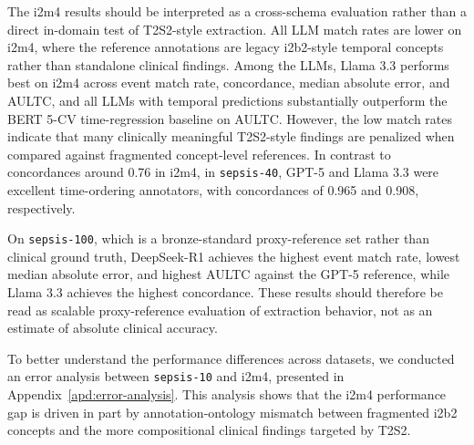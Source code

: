 \documentclass[pmlr,twocolumn,10pt]{jmlr} %
\begin{document}
The i2m4 results should be interpreted as a cross-schema evaluation rather than a direct in-domain test of T2S2-style extraction.
All LLM match rates are lower on i2m4, where the reference annotations are legacy i2b2-style temporal concepts rather than standalone clinical findings.
Among the LLMs, Llama 3.3 performs best on i2m4 across event match rate, concordance, median absolute error, and AULTC, and all LLMs with temporal predictions substantially outperform the BERT 5-CV time-regression baseline on AULTC. However, the low match rates indicate that many clinically meaningful T2S2-style findings are penalized when compared against fragmented concept-level references. 
In contrast to concordances around 0.76 in i2m4, in \texttt{sepsis-40}, GPT-5 and Llama 3.3 were excellent time-ordering annotators, with concordances of 0.965 and 0.908, respectively.

On \texttt{sepsis-100}, which is a bronze-standard proxy-reference set rather than clinical ground truth, DeepSeek-R1 achieves the highest event match rate, lowest median absolute error, and highest AULTC against the GPT-5 reference, while Llama 3.3 achieves the highest concordance.
These results should therefore be read as scalable proxy-reference evaluation of extraction behavior, not as an estimate of absolute clinical accuracy.

To better understand the performance differences across datasets, we conducted an error analysis between \texttt{sepsis-10} and i2m4, presented in Appendix~\ref{apd:error-analysis}.
This analysis shows that the i2m4 performance gap is driven in part by annotation-ontology mismatch between fragmented i2b2 concepts and the more compositional clinical findings targeted by T2S2.

\end{document}
